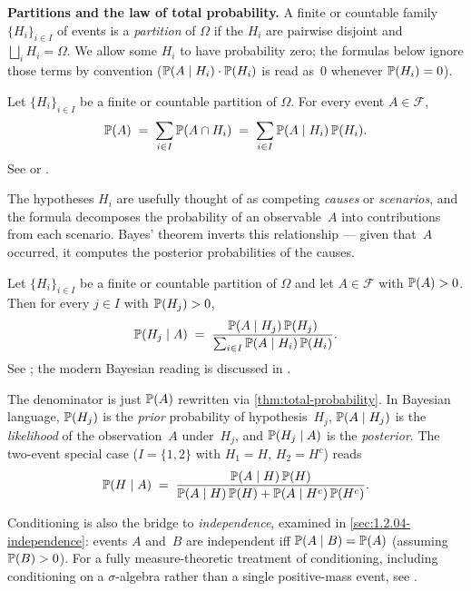 \medskip
\noindent\textbf{Partitions and the law of total probability.}
A finite or countable family $\{H_i\}_{i \in I}$ of events is a
\emph{partition} of $\Omega$ if the $H_i$ are pairwise disjoint and
$\bigsqcup_{i} H_i = \Omega$. We allow some $H_i$ to have probability
zero; the formulas below ignore those terms by convention
($\mathbb{P}(A \mid H_i) \cdot \mathbb{P}(H_i)$ is read as~$0$ whenever
$\mathbb{P}(H_i) = 0$).

\begin{theorem}
\label{thm:total-probability}
Let $\{H_i\}_{i \in I}$ be a finite or countable partition of $\Omega$.
For every event $A \in \mathcal{F}$,
\[
  \mathbb{P}(A) \;=\; \sum_{i \in I} \mathbb{P}(A \cap H_i) \;=\; \sum_{i \in I} \mathbb{P}(A \mid H_i)\, \mathbb{P}(H_i).
\]
See \cite[Ch.~I, \S~3]{Shiryaev1989} or \cite[Ch.~I, \S~6]{Gnedenko2001}.
\end{theorem}

The hypotheses $H_i$ are usefully thought of as competing
\emph{causes} or \emph{scenarios}, and the formula decomposes the
probability of an observable~$A$ into contributions from each
scenario. Bayes' theorem inverts this relationship — given that~$A$
occurred, it computes the posterior probabilities of the causes.

\begin{theorem}[Bayes]
\label{thm:bayes}
Let $\{H_i\}_{i \in I}$ be a finite or countable partition of $\Omega$
and let $A \in \mathcal{F}$ with $\mathbb{P}(A) > 0$. Then for every
$j \in I$ with $\mathbb{P}(H_j) > 0$,
\[
  \mathbb{P}(H_j \mid A) \;=\; \frac{\mathbb{P}(A \mid H_j)\, \mathbb{P}(H_j)}{\sum_{i \in I} \mathbb{P}(A \mid H_i)\, \mathbb{P}(H_i)}.
\]
See \cite[Ch.~I, \S~3]{Shiryaev1989}; the modern Bayesian reading is
discussed in \cite[Ch.~I, \S~6]{Gnedenko2001}.
\end{theorem}

The denominator is just $\mathbb{P}(A)$ rewritten via
\cref{thm:total-probability}. In Bayesian language, $\mathbb{P}(H_j)$ is
the \emph{prior} probability of hypothesis~$H_j$,
$\mathbb{P}(A \mid H_j)$ is the \emph{likelihood} of the
observation~$A$ under~$H_j$, and $\mathbb{P}(H_j \mid A)$ is the
\emph{posterior}. The two-event special case ($I = \{1, 2\}$ with
$H_1 = H$, $H_2 = H^c$) reads
\[
  \mathbb{P}(H \mid A) \;=\; \frac{\mathbb{P}(A \mid H)\, \mathbb{P}(H)}{\mathbb{P}(A \mid H)\, \mathbb{P}(H) + \mathbb{P}(A \mid H^c)\, \mathbb{P}(H^c)}.
\]

\begin{remark}
Conditioning is also the bridge to \emph{independence}, examined in
\cref{sec:1.2.04-independence}: events $A$ and~$B$ are independent
iff $\mathbb{P}(A \mid B) = \mathbb{P}(A)$ (assuming $\mathbb{P}(B) > 0$). For a
fully measure-theoretic treatment of conditioning, including
conditioning on a $\sigma$-algebra rather than a single positive-mass
event, see \cite[Ch.~II, \S~7]{Shiryaev1989}.
\end{remark}

